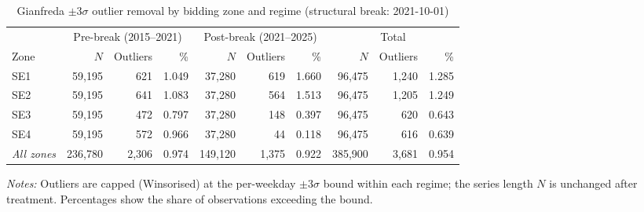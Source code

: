 \begin{table}[htbp]
  \centering
  \small
  \caption{Gianfreda $\pm3\sigma$ outlier removal by bidding zone and regime (structural break: 2021-10-01)}
  \label{tab:outlier_removal}
  \begin{tabular}{l rrr rrr rrr}
    \toprule
    & \multicolumn{3}{c}{Pre-break (2015--2021)} & \multicolumn{3}{c}{Post-break (2021--2025)} & \multicolumn{3}{c}{Total} \\
    \cmidrule(lr){2-4}\cmidrule(lr){5-7}\cmidrule(lr){8-10}
    Zone & $N$ & Outliers & \% & $N$ & Outliers & \% & $N$ & Outliers & \% \\
    \midrule
    SE1 & 59,195 & 621 & 1.049 & 37,280 & 619 & 1.660 & 96,475 & 1,240 & 1.285 \\
    SE2 & 59,195 & 641 & 1.083 & 37,280 & 564 & 1.513 & 96,475 & 1,205 & 1.249 \\
    SE3 & 59,195 & 472 & 0.797 & 37,280 & 148 & 0.397 & 96,475 & 620 & 0.643 \\
    SE4 & 59,195 & 572 & 0.966 & 37,280 & 44 & 0.118 & 96,475 & 616 & 0.639 \\
    \midrule
    \textit{All zones} & 236,780 & 2,306 & 0.974 & 149,120 & 1,375 & 0.922 & 385,900 & 3,681 & 0.954 \\
    \bottomrule
  \end{tabular}
  \begin{minipage}{\linewidth}    \footnotesize\vspace{4pt}    \textit{Notes:} Outliers are capped (Winsorised) at the per-weekday $\pm3\sigma$ bound within each regime; the series length $N$ is unchanged after treatment. Percentages show the share of observations exceeding the bound.  \end{minipage}
\end{table}

